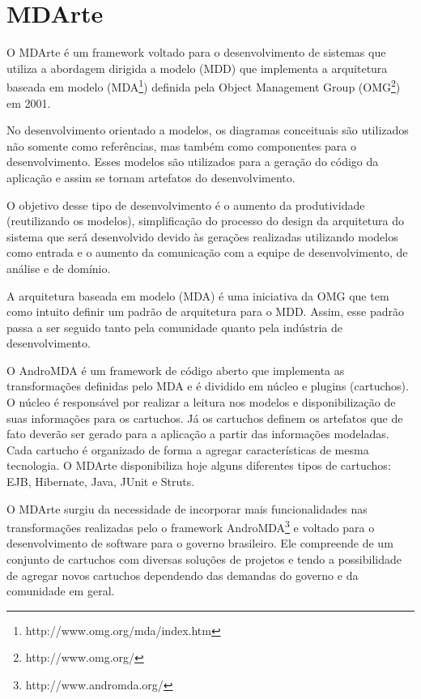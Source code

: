 \chapter{MDArte}
O MDArte é um framework voltado para o desenvolvimento de sistemas que utiliza a
abordagem dirigida a modelo (MDD) que implementa a arquitetura baseada em modelo
(MDA\footnote{http://www.omg.org/mda/index.htm}) definida pela Object Management
Group (OMG\footnote{http://www.omg.org/}) em 2001.

No desenvolvimento orientado a modelos, os diagramas conceituais são utilizados
não somente como referências, mas também como componentes para o
desenvolvimento. Esses modelos são utilizados para a geração do código da
aplicação e assim se tornam artefatos do desenvolvimento.

O objetivo desse tipo de desenvolvimento é o aumento da produtividade
(reutilizando os modelos), simplificação do processo do design da arquitetura do
sistema que será desenvolvido devido às gerações realizadas utilizando modelos
como entrada e o aumento da comunicação com a equipe de desenvolvimento, de
análise e de domínio.

A arquitetura baseada em modelo (MDA) é uma iniciativa da OMG que tem como
intuito definir um padrão de arquitetura para o MDD. Assim, esse padrão passa a
ser seguido tanto pela comunidade quanto pela indústria de desenvolvimento.

O AndroMDA é um framework de código aberto que implementa as transformações
definidas pelo MDA e é dividido em núcleo e plugins (cartuchos). O núcleo é
responsável por realizar a leitura nos modelos e disponibilização de suas
informações para os cartuchos. Já os cartuchos definem os artefatos que de fato
deverão ser gerado para a aplicação a partir das informações modeladas. Cada
cartucho é organizado de forma a agregar características de mesma tecnologia.
O MDArte disponibiliza hoje alguns diferentes tipos de cartuchos: EJB,
Hibernate, Java, JUnit e Struts.

O MDArte surgiu da necessidade de incorporar mais funcionalidades nas
transformações realizadas pelo o framework
AndroMDA\footnote{http://www.andromda.org/} e voltado para o desenvolvimento de
software para o governo brasileiro. Ele compreende de um conjunto de cartuchos
com diversas soluções de projetos e tendo a possibilidade de agregar novos
cartuchos dependendo das demandas do governo e da comunidade em geral.